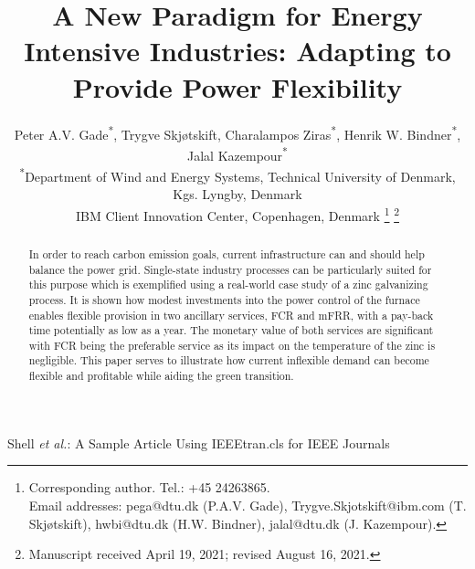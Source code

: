 \documentclass[lettersize,journal]{IEEEtran}
\begin{document}
\title{A New Paradigm for Energy Intensive Industries: Adapting to Provide Power Flexibility}

\author{Peter A.V. Gade\textsuperscript{*}\textsuperscript{\textdagger}, Trygve Skjøtskift\textsuperscript{\textdagger}, Charalampos Ziras\textsuperscript{*}, Henrik W. Bindner\textsuperscript{*}, Jalal Kazempour\textsuperscript{*} \\
    \textsuperscript{*}Department of Wind and Energy Systems, Technical University of Denmark, Kgs. Lyngby, Denmark \\
    \textsuperscript{\textdagger}IBM Client Innovation Center, Copenhagen, Denmark
    \thanks{Corresponding author. Tel.: +45 24263865. \\ Email addresses: pega@dtu.dk (P.A.V. Gade), Trygve.Skjotskift@ibm.com (T. Skjøtskift), hwbi@dtu.dk (H.W. Bindner), jalal@dtu.dk (J. Kazempour).}%
    \thanks{Manuscript received April 19, 2021; revised August 16, 2021.}}


%
{Shell \MakeLowercase{\textit{et al.}}: A Sample Article Using IEEEtran.cls for IEEE Journals}


\maketitle


\begin{abstract}
    In order to reach carbon emission goals, current infrastructure can and should help balance the power grid. Single-state industry processes can be particularly suited for this purpose which is exemplified using a real-world case study of a zinc galvanizing process. It is shown how modest investments into the power control of the furnace enables flexible provision in two ancillary services, FCR and mFRR, with a pay-back time potentially as low as a year. The monetary value of both services are significant with FCR being the preferable service as its impact on the temperature of the zinc is negligible. This paper serves to illustrate how current inflexible demand can become flexible and profitable while aiding the green transition.
\end{abstract}
\end{document}
